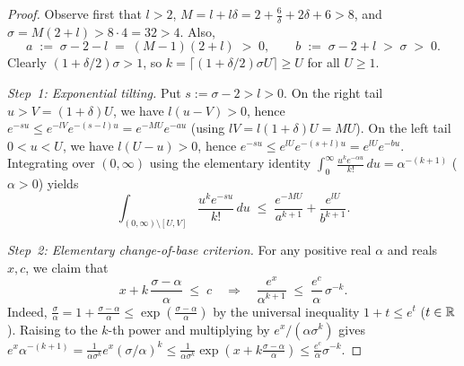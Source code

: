 \begin{proof}
Observe first that $l > 2$, $M = l + l\delta = 2 + \frac{6}{\delta} + 2\delta + 6 > 8$, and $\sigma = M(2+l) > 8 \cdot 4 = 32 > 4$. Also,
\[
  a \;:=\; \sigma - 2 - l \;=\; (M - 1)(2 + l) \;>\; 0, \qquad
  b \;:=\; \sigma - 2 + l \;>\; \sigma \;>\; 0.
\]
Clearly $(1 + \delta/2)\sigma > 1$, so $k = \lceil (1 + \delta/2)\sigma U \rceil \ge U$ for all $U \ge 1$.

\emph{Step~1: Exponential tilting.}
Put $s := \sigma - 2 > l > 0$. On the right tail $u > V = (1+\delta)U$, we have $l(u - V) > 0$, hence $e^{-su} \le e^{-lV} e^{-(s-l)u} = e^{-MU} e^{-au}$ (using $lV = l(1+\delta)U = MU$). On the left tail $0 < u < U$, we have $l(U - u) > 0$, hence $e^{-su} \le e^{lU} e^{-(s+l)u} = e^{lU} e^{-bu}$. Integrating over $(0, \infty)$ using the elementary identity $\int_0^\infty \frac{u^k e^{-\alpha u}}{k!}\,du = \alpha^{-(k+1)}$ ($\alpha > 0$) yields
\begin{equation}
\label{eq:02:tilt-sum}
  \int_{(0,\infty) \setminus [U, V]} \frac{u^k e^{-su}}{k!}\,du
  \;\le\; \frac{e^{-MU}}{a^{k+1}} + \frac{e^{lU}}{b^{k+1}}.
\end{equation}

\emph{Step~2: Elementary change-of-base criterion.}
For any positive real $\alpha$ and reals $x, c$, we claim that
\begin{equation}
\label{eq:02:change-base}
  x + k\,\frac{\sigma - \alpha}{\alpha} \;\le\; c \quad\Longrightarrow\quad \frac{e^x}{\alpha^{k+1}} \;\le\; \frac{e^c}{\alpha}\,\sigma^{-k}.
\end{equation}
Indeed, $\frac{\sigma}{\alpha} = 1 + \frac{\sigma - \alpha}{\alpha} \le \exp\!\left(\frac{\sigma - \alpha}{\alpha}\right)$ by the universal inequality $1 + t \le e^t$ ($t \in \mathbb{R}$). Raising to the $k$-th power and multiplying by $e^x / (\alpha \sigma^k)$ gives $e^x \alpha^{-(k+1)} = \frac{1}{\alpha\sigma^k} e^x (\sigma/\alpha)^k \le \frac{1}{\alpha\sigma^k} \exp(x + k\frac{\sigma-\alpha}{\alpha}) \le \frac{e^c}{\alpha}\sigma^{-k}$.


\end{proof}
